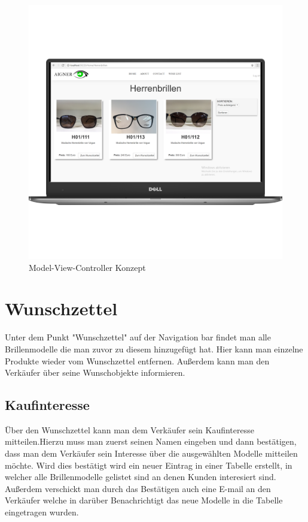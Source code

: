 \begin{figure}[H]
\begin{center}
	\includegraphics[scale=.2]{images/Brillen.png}
\end{center}
	\caption{Model-View-Controller Konzept}
	\label{fig:sample}
\end{figure}


\section{Wunschzettel}
Unter dem Punkt "Wunschzettel" auf der Navigation bar findet man alle Brillenmodelle die man zuvor zu diesem hinzugefügt hat. Hier kann man einzelne Produkte wieder vom Wunschzettel entfernen. Außerdem kann man den Verkäufer über seine Wunschobjekte informieren.

\subsection{Kaufinteresse}
Über den Wunschzettel kann man dem Verkäufer sein Kaufinteresse mitteilen.Hierzu muss man zuerst seinen Namen eingeben und dann bestätigen, dass man dem Verkäufer sein Interesse über die ausgewählten Modelle mitteilen möchte. Wird dies bestätigt wird ein neuer Eintrag in einer Tabelle erstellt, in welcher alle Brillenmodelle gelistet sind an denen Kunden interesiert sind. Außerdem verschickt man durch das Bestätigen auch eine E-mail an den Verkäufer welche in darüber Benachrichtigt das neue Modelle in die Tabelle eingetragen wurden.



